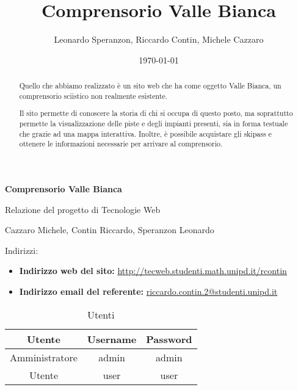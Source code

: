 \documentclass[12pt, a4paper]{article}
\title{Comprensorio Valle Bianca}
\author{Leonardo Speranzon, Riccardo Contin, Michele Cazzaro}
\date{\today}
\begin{document}
    \begin{titlepage}
        \begin{center}
            \vspace*{1cm}
            
            \Huge
            \textbf{Comprensorio Valle Bianca}

            \vspace{0.5cm}
            \LARGE
            Relazione del progetto di Tecnologie Web

            \vspace{1.5cm}
            \Large
            Cazzaro Michele, Contin Riccardo, Speranzon Leonardo
        \end{center}
            \vfill

            \large
            Indirizzi:
            \begin{itemize}
                \item \textbf{Indirizzo web del sito: } \url{http://tecweb.studenti.math.unipd.it/rcontin}
                \item \textbf{Indirizzo email del referente: } \href{mailto:riccardo.contin.2@studenti.unipd.it}{riccardo.contin.2@studenti.unipd.it}
            \end{itemize}

            \begin{table}[H]
                \centering
                \begin{tabular}{|c|c|c|}
                    \hline
                    \rowcolor[HTML]{96FFFB} 
                    \textbf{Utente} & \textbf{Username} & \textbf{Password} \\ \hline
                    Amministratore & admin & admin \\ \hline
                    Utente & user & user \\ \hline
                \end{tabular}
                \caption{Utenti}
            \end{table}
        
    \end{titlepage}

    \tableofcontents

    \newpage

    \begin{abstract}
        Quello che abbiamo realizzato è un sito web che ha come oggetto Valle Bianca, un comprensorio sciistico non realmente esistente.

        Il sito permette di conoscere la storia di chi si occupa di questo posto, ma soprattutto permette la visualizzazione delle piste e degli impianti presenti, sia in forma
        testuale che grazie ad una mappa interattiva. Inoltre, è possibile acquistare gli skipass e ottenere le informazioni necessarie per arrivare al comprensorio. 
    \end{abstract}

    
    \newpage
    
    \newpage
    
    \newpage
    
\end{document}
